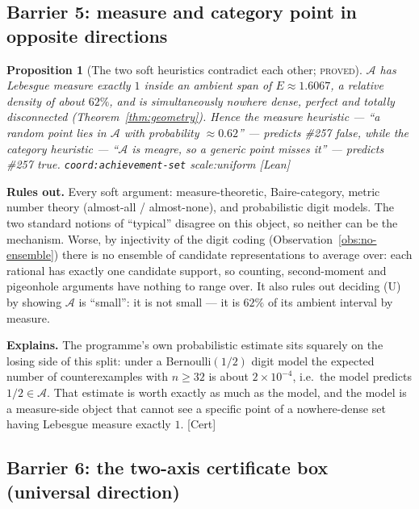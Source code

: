 \documentclass[11pt]{article}
\theoremstyle{plain}
\newtheorem{prop}[thm]{Proposition}
\theoremstyle{definition}
\theoremstyle{remark}
\newcommand{\ev}[1]{{\small\textsf{[#1]}}\xspace}
\newcommand{\scale}[1]{{\small\textsf{scale:#1}}\xspace}
\newcommand{\coord}[1]{\texorpdfstring{{\small\nolinkurl{coord:#1}}}{coord:#1}\xspace}
\begin{document}
\subsection{Barrier 5: measure and category point in opposite directions}
\label{bar:measure}

\begin{prop}[The two soft heuristics contradict each other; \textsc{proved}]
\label{prop:soft}
$\mathcal{A}$ has Lebesgue measure exactly $1$ inside an ambient span of $E \approx 1.6067$, a
relative density of about $62\%$, and is simultaneously nowhere dense, perfect and totally
disconnected (Theorem~\ref{thm:geometry}). Hence the measure heuristic --- ``a random point lies in
$\mathcal{A}$ with probability $\approx 0.62$'' --- predicts \#257 \emph{false}, while the category
heuristic --- ``$\mathcal{A}$ is meagre, so a generic point misses it'' --- predicts \#257
\emph{true}. \coord{achievement-set} \scale{uniform} \ev{Lean}
\end{prop}

\textbf{Rules out.} Every soft argument: measure-theoretic, Baire-category, metric number theory
(almost-all / almost-none), and probabilistic digit models. The two standard notions of ``typical''
disagree on this object, so neither can be the mechanism. Worse, by injectivity of the digit coding
(Observation~\ref{obs:no-ensemble}) there is no ensemble of candidate representations to average
over: each rational has exactly one candidate support, so counting, second-moment and pigeonhole
arguments have nothing to range over. It also rules out deciding (U) by showing $\mathcal{A}$ is
``small'': it is not small --- it is $62\%$ of its ambient interval by measure.

\textbf{Explains.} The programme's own probabilistic estimate sits squarely on the losing side of
this split: under a Bernoulli$(1/2)$ digit model the expected number of counterexamples with
$n \ge 32$ is about $2 \times 10^{-4}$, i.e.\ the model predicts $1/2 \in \mathcal{A}$. That
estimate is worth exactly as much as the model, and the model is a measure-side object that cannot
see a specific point of a nowhere-dense set having Lebesgue measure exactly $1$. \ev{Cert}

\subsection{Barrier 6: the two-axis certificate box (universal direction)}
\label{bar:box}
\end{document}
